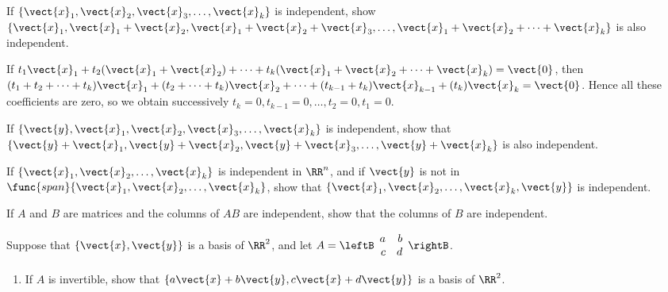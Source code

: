 \begin{multicols}{2}
\begin{ex}
If $\{\vect{x}_{1}, \vect{x}_{2}, \vect{x}_{3}, \dots, \vect{x}_{k}\}$ is independent, show $\{\vect{x}_{1}, \vect{x}_{1} + \vect{x}_{2}, \vect{x}_{1} + \vect{x}_{2} + \vect{x}_{3}, \dots, \vect{x}_{1} + \vect{x}_{2} + \dots + \vect{x}_{k}\}$ is also independent.

\begin{sol}
If $t_{1}\vect{x}_{1} + t_{2}(\vect{x}_{1} + \vect{x}_{2}) + \dots + t_{k}(\vect{x}_{1} + \vect{x}_{2} + \dots + \vect{x}_{k}) = \vect{0}$, then $(t_{1} + t_{2} + \dots + t_{k})\vect{x}_{1} + (t_{2} + \dots + t_{k})\vect{x}_{2} + \dots + (t_{k-1} + t_{k})\vect{x}_{k-1} + (t_{k})\vect{x}_{k} = \vect{0}$. Hence all these coefficients are zero, so we obtain successively $t_{k} = 0, t_{k-1} = 0, \dots, t_{2} = 0, t_{1} = 0$.
\end{sol}
\end{ex}

\begin{ex}
If $\{\vect{y}, \vect{x}_{1}, \vect{x}_{2}, \vect{x}_{3}, \dots, \vect{x}_{k}\}$ is independent, show that $\{\vect{y} + \vect{x}_{1}, \vect{y} + \vect{x}_{2}, \vect{y} + \vect{x}_{3}, \dots, \vect{y} + \vect{x}_{k}\}$ is also independent.
\end{ex}

\begin{ex}
If $\{\vect{x}_{1}, \vect{x}_{2}, \dots, \vect{x}_{k}\}$ is independent in $\RR^n$, and if $\vect{y}$ is not in $\func{span}\{\vect{x}_{1}, \vect{x}_{2}, \dots, \vect{x}_{k}\}$, show that $\{\vect{x}_{1}, \vect{x}_{2}, \dots, \vect{x}_{k}, \vect{y}\}$ is independent.
\end{ex}

\begin{ex}
If $A$ and $B$ are matrices and the columns of $AB$ are independent, show that the columns of $B$ are independent.
\end{ex}

\begin{ex}
Suppose that $\{\vect{x}, \vect{y}\}$ is a basis of $\RR^2$, and let
$A =
\leftB \begin{array}{rr}
a & b \\
c & d
\end{array} \rightB$.

\begin{enumerate}[label={\alph*.}]
\item If $A$ is invertible, show that $\{a\vect{x} + b\vect{y}, c\vect{x} + d\vect{y}\}$ is a basis of $\RR^2$.


\end{enumerate}
\end{ex}
\end{multicols}
